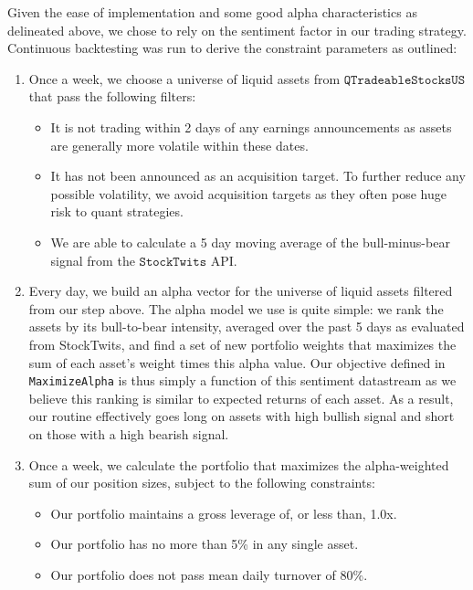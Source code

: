 \documentclass[11,]{article}
\providecommand{\tightlist}{%
  \setlength{\itemsep}{0pt}\setlength{\parskip}{0pt}}
\begin{document}
Given the ease of implementation and some good alpha characteristics as
delineated above, we chose to rely on the sentiment factor in our
trading strategy. Continuous backtesting was run to derive the
constraint parameters as outlined:

\begin{enumerate}
\def\labelenumi{\arabic{enumi}.}
\tightlist
\item
  Once a week, we choose a universe of liquid assets from
  \(\texttt{QTradeableStocksUS}\) that pass the following filters:

  \begin{itemize}
  \tightlist
  \item
    It is not trading within 2 days of any earnings announcements as
    assets are generally more volatile within these dates.
  \item
    It has not been announced as an acquisition target. To further
    reduce any possible volatility, we avoid acquisition targets as they
    often pose huge risk to quant strategies.
  \item
    We are able to calculate a 5 day moving average of the
    bull-minus-bear signal from the \(\texttt{StockTwits}\) API.
  \end{itemize}
\item
  Every day, we build an alpha vector for the universe of liquid assets
  filtered from our step above. The alpha model we use is quite simple:
  we rank the assets by its bull-to-bear intensity, averaged over the
  past 5 days as evaluated from StockTwits, and find a set of new
  portfolio weights that maximizes the sum of each asset's weight times
  this alpha value. Our objective defined in \texttt{MaximizeAlpha} is
  thus simply a function of this sentiment datastream as we believe this
  ranking is similar to expected returns of each asset. As a result, our
  routine effectively goes long on assets with high bullish signal and
  short on those with a high bearish signal.
\item
  Once a week, we calculate the portfolio that maximizes the
  alpha-weighted sum of our position sizes, subject to the following
  constraints:

  \begin{itemize}
  \tightlist
  \item
    Our portfolio maintains a gross leverage of, or less than, 1.0x.
  \item
    Our portfolio has no more than 5\% in any single asset.
  \item
    Our portfolio does not pass mean daily turnover of 80\%.
  \end{itemize}
\end{enumerate}
\end{document}
